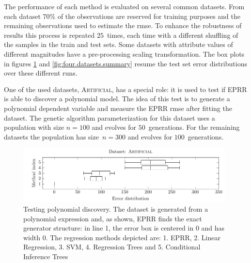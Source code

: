 \documentclass[times,review,preprint]{elsarticle}
\begin{document}
The performance of each method is evaluated on several common datasets. From each dataset 70\% of the observations are reserved for training purposes and the remaining observations used to estimate the \ac{rmse}. To enhance the robustness of results this process is repeated $25$~times, each time with a different shuffling of the samples in the train and test sets. Some datasets with attribute values of different magnitudes have a pre-processing scaling transformation. The box plots in figures \ref{artificial_dataset1_lambda1.0} and \ref{fig:four.datasets.summary} resume the test set error distributions over these different runs.

One of the used datasets, \textsc{Artificial}, has a special role: it is used to test if \ac{EPRR} is able to discover a polynomial model. The idea of this test is to generate a polynomial dependent variable and measure the \ac{EPRR} \ac{rmse} after fitting the dataset. The genetic algorithm parameterization for this dataset uses a population with size $n=100$ and evolves for $50$~generations. For the remaining datasets the population has size~$n=300$ and evolves for $100$~generations.

\begin{figure}[tb]\begin{center}
\includegraphics[width=0.98\textwidth]{figure_2.pdf}
\caption{Testing polynomial discovery. The dataset is generated from a polynomial expression and, as shown, \ac{EPRR} finds the exact generator structure: in line 1, the error box is centered in $0$ and has width $0$.  The regression methods depicted are: 1. \ac{EPRR}, 2. Linear Regression, 3. SVM, 4. Regression Trees and 5. Conditional Inference Trees}
\label{artificial_dataset1_lambda1.0}
\end{center}
\end{figure}
\end{document}
